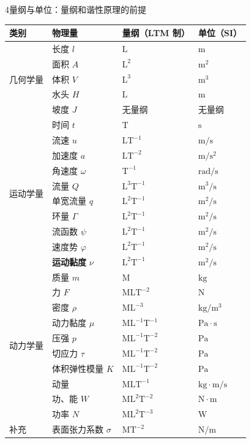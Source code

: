 \begin{kaodian}{4}{量纲与单位：量纲和谐性原理的前提}
\begin{center}
\begin{tabularx}{\textwidth}{@{}llXX@{}}
\toprule
类别 & 物理量 & 量纲（LTM 制） & 单位（SI） \\
\midrule
\multirow{5}{*}{几何学量} & 长度 $l$ & $\mathrm{L}$ & $\mathrm{m}$ \\
 & 面积 $A$ & $\mathrm{L^{2}}$ & $\mathrm{m^{2}}$ \\
 & 体积 $V$ & $\mathrm{L^{3}}$ & $\mathrm{m^{3}}$ \\
 & 水头 $H$ & $\mathrm{L}$ & $\mathrm{m}$ \\
 & 坡度 $J$ & 无量纲 & 无量纲 \\
\midrule
\multirow{10}{*}{运动学量} & 时间 $t$ & $\mathrm{T}$ & $\mathrm{s}$ \\
 & 流速 $u$ & $\mathrm{LT^{-1}}$ & $\mathrm{m/s}$ \\
 & 加速度 $a$ & $\mathrm{LT^{-2}}$ & $\mathrm{m/s^{2}}$ \\
 & 角速度 $\omega$ & $\mathrm{T^{-1}}$ & $\mathrm{rad/s}$ \\
 & 流量 $Q$ & $\mathrm{L^{3}T^{-1}}$ & $\mathrm{m^{3}/s}$ \\
 & 单宽流量 $q$ & $\mathrm{L^{2}T^{-1}}$ & $\mathrm{m^{2}/s}$ \\
 & 环量 $\Gamma$ & $\mathrm{L^{2}T^{-1}}$ & $\mathrm{m^{2}/s}$ \\
 & 流函数 $\psi$ & $\mathrm{L^{2}T^{-1}}$ & $\mathrm{m^{2}/s}$ \\
 & 速度势 $\varphi$ & $\mathrm{L^{2}T^{-1}}$ & $\mathrm{m^{2}/s}$ \\
 & \textbf{运动黏度} $\nu$ & $\mathrm{L^{2}T^{-1}}$ & $\mathrm{m^{2}/s}$ \\
\midrule
\multirow{10}{*}{动力学量} & 质量 $m$ & $\mathrm{M}$ & $\mathrm{kg}$ \\
 & 力 $F$ & $\mathrm{MLT^{-2}}$ & $\mathrm{N}$ \\
 & 密度 $\rho$ & $\mathrm{ML^{-3}}$ & $\mathrm{kg/m^{3}}$ \\
 & 动力黏度 $\mu$ & $\mathrm{ML^{-1}T^{-1}}$ & $\mathrm{Pa\cdot s}$ \\
 & 压强 $p$ & $\mathrm{ML^{-1}T^{-2}}$ & $\mathrm{Pa}$ \\
 & 切应力 $\tau$ & $\mathrm{ML^{-1}T^{-2}}$ & $\mathrm{Pa}$ \\
 & 体积弹性模量 $K$ & $\mathrm{ML^{-1}T^{-2}}$ & $\mathrm{Pa}$ \\
 & 动量 & $\mathrm{MLT^{-1}}$ & $\mathrm{kg\cdot m/s}$ \\
 & 功、能 $W$ & $\mathrm{ML^{2}T^{-2}}$ & $\mathrm{N\cdot m}$ \\
 & 功率 $N$ & $\mathrm{ML^{2}T^{-3}}$ & $\mathrm{W}$ \\
\midrule
补充 & 表面张力系数 $\sigma$ & $\mathrm{MT^{-2}}$ & $\mathrm{N/m}$ \\
\bottomrule
\end{tabularx}
\end{center}


\end{kaodian}
